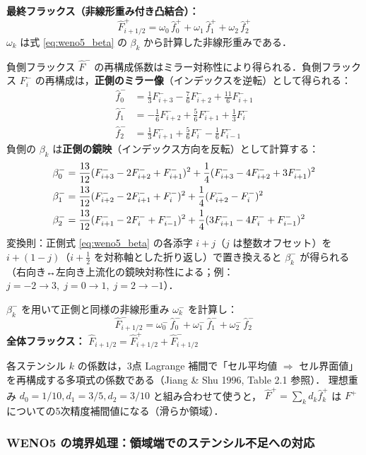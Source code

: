 \textbf{最終フラックス（非線形重み付き凸結合）：}
\[
  \hat{F}^+_{i+1/2} = \omega_0\,\hat{f}^+_0 + \omega_1\,\hat{f}^+_1 + \omega_2\,\hat{f}^+_2
\]
$\omega_k$ は式 \eqref{eq:weno5_beta} の $\beta_k$ から計算した非線形重みである．

負側フラックス $\hat{F}^-$ の再構成係数はミラー対称性により得られる．負側フラックス $F^-_i$ の再構成は，\textbf{正側のミラー像}（インデックスを逆転）として得られる：
\begin{align}
  \hat{f}^-_0 &= \frac{1}{3}F^-_{i+3} - \frac{7}{6}F^-_{i+2} + \frac{11}{6}F^-_{i+1}
  \\[4pt]
  \hat{f}^-_1 &= -\frac{1}{6}F^-_{i+2} + \frac{5}{6}F^-_{i+1} + \frac{1}{3}F^-_i
  \\[4pt]
  \hat{f}^-_2 &= \frac{1}{3}F^-_{i+1} + \frac{5}{6}F^-_i - \frac{1}{6}F^-_{i-1}
\end{align}
負側の $\beta_k$ は\textbf{正側の鏡映}（インデックス方向を反転）として計算する：
\begin{align}
  \beta_0^- &= \frac{13}{12}(F^-_{i+3}-2F^-_{i+2}+F^-_{i+1})^2
              + \frac{1}{4}(F^-_{i+3}-4F^-_{i+2}+3F^-_{i+1})^2 \notag\\
  \beta_1^- &= \frac{13}{12}(F^-_{i+2}-2F^-_{i+1}+F^-_i)^2
              + \frac{1}{4}(F^-_{i+2}-F^-_i)^2 \notag\\
  \beta_2^- &= \frac{13}{12}(F^-_{i+1}-2F^-_i+F^-_{i-1})^2
              + \frac{1}{4}(3F^-_{i+1}-4F^-_i+F^-_{i-1})^2
  \label{eq:weno5_beta_minus}
\end{align}
変換則：正側式 \eqref{eq:weno5_beta} の各添字 $i+j$（$j$ は整数オフセット）を
$i+(1-j)$（$i+\tfrac{1}{2}$ を対称軸とした折り返し）で置き換えると $\beta_k^-$ が得られる
（右向き↔左向き上流化の鏡映対称性による；例：$j=-2 \to 3,\;j=0 \to 1,\;j=2 \to -1$）．

$\beta_k^-$ を用いて正側と同様の非線形重み $\omega_k^-$ を計算し：
\[
  \hat{F}^-_{i+1/2} = \omega_0^-\,\hat{f}^-_0 + \omega_1^-\,\hat{f}^-_1 + \omega_2^-\,\hat{f}^-_2
\]
\textbf{全体フラックス：} $\hat{F}_{i+1/2} = \hat{F}^+_{i+1/2} + \hat{F}^-_{i+1/2}$

\noindent 各ステンシル $k$ の係数は，3点 Lagrange 補間で「セル平均値 $\Rightarrow$ セル界面値」を再構成する多項式の係数である（Jiang \& Shu 1996, Table 2.1 参照）．
理想重み $d_0 = 1/10, d_1 = 3/5, d_2 = 3/10$ と組み合わせて使うと，
$\hat{F}^+ = \sum_k d_k \hat{f}^+_k$ は $F^+$ についての5次精度補間値になる（滑らか領域）．

\subsubsection{WENO5 の境界処理：領域端でのステンシル不足への対応}
\label{sec:weno5_boundary}

